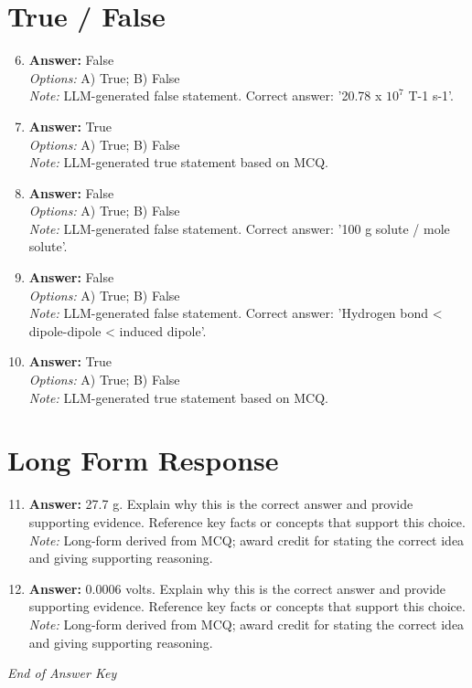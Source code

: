 \documentclass[12pt]{article}
\begin{document}
\section*{True / False}
\begin{enumerate}[label=\arabic*.]
\setcounter{enumi}{5}
\item \textbf{Answer:} False
\\ \textit{Options:} A) True; B) False
\\ \textit{Note:} LLM-generated false statement. Correct answer: '20.78 x $10^7$ T-1 s-1'.
\item \textbf{Answer:} True
\\ \textit{Options:} A) True; B) False
\\ \textit{Note:} LLM-generated true statement based on MCQ.
\item \textbf{Answer:} False
\\ \textit{Options:} A) True; B) False
\\ \textit{Note:} LLM-generated false statement. Correct answer: '100 g solute / mole solute'.
\item \textbf{Answer:} False
\\ \textit{Options:} A) True; B) False
\\ \textit{Note:} LLM-generated false statement. Correct answer: 'Hydrogen bond \textless{} dipole-dipole \textless{} induced dipole'.
\item \textbf{Answer:} True
\\ \textit{Options:} A) True; B) False
\\ \textit{Note:} LLM-generated true statement based on MCQ.
\end{enumerate}

\section*{Long Form Response}
\begin{enumerate}[label=\arabic*.]
\setcounter{enumi}{10}
\item \textbf{Answer:} 27.7 g. Explain why this is the correct answer and provide supporting evidence. Reference key facts or concepts that support this choice.
\\ \textit{Note:} Long-form derived from MCQ; award credit for stating the correct idea and giving supporting reasoning.
\item \textbf{Answer:} 0.0006 volts. Explain why this is the correct answer and provide supporting evidence. Reference key facts or concepts that support this choice.
\\ \textit{Note:} Long-form derived from MCQ; award credit for stating the correct idea and giving supporting reasoning.
\end{enumerate}

\vfill
\noindent\textit{End of Answer Key}
\end{document}

